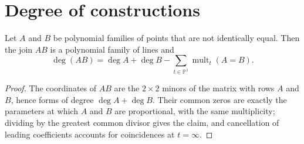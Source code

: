 \section{Degree of constructions}\label{sec:degree-of-constructions}

\begin{thm}\label{thm:zack-join-rigorous}
  Let $A$ and $B$ be polynomial families of points that are not identically
  equal. Then the join $AB$ is a polynomial family of lines and
  \[ \deg(AB) = \deg A + \deg B - \sum_{t \in \mathbb{P}^1} \operatorname{mult}_t(A = B). \]
\end{thm}

\begin{proof}
  The coordinates of $AB$ are the $2 \times 2$ minors of the matrix with rows
  $A$ and $B$, hence forms of degree $\deg A + \deg B$. Their common zeros are
  exactly the parameters at which $A$ and $B$ are proportional, with the same
  multiplicity; dividing by the greatest common divisor gives the claim, and
  cancellation of leading coefficients accounts for coincidences at $t=\infty$.
\end{proof}
